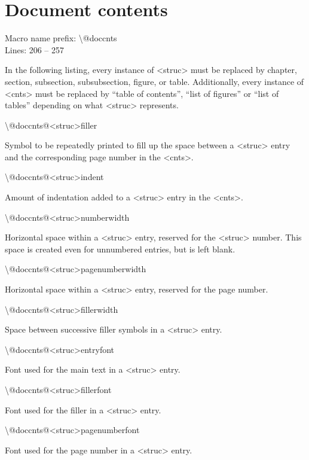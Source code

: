 \documentclass[twoside,openany]{thesis}
\begin{document}
\section{Document contents}\label{sec:Document contents}

Macro name prefix: {\ttfamily\textbackslash @doccnts}\\
Lines: 206 -- 257

In the following listing, every instance of {\ttfamily<struc>} must be replaced by {\ttfamily chapter}, {\ttfamily section}, {\ttfamily subsection}, {\ttfamily subsubsection}, {\ttfamily figure}, or {\ttfamily table}.
Additionally, every instance of {\ttfamily<cnts>} must be replaced by ``table of contents'', ``list of figures'' or ``list of tables'' depending on what {\ttfamily<struc>} represents.

\begin{listing}

\item   {\ttfamily\textbackslash @doccnts@<struc>filler}

        Symbol to be repeatedly printed to fill up the space between a {\ttfamily<struc>} entry and the corresponding page number in the {\ttfamily<cnts>}.

\item   {\ttfamily\textbackslash @doccnts@<struc>indent}

        Amount of indentation added to a {\ttfamily<struc>} entry in the {\ttfamily<cnts>}.

\item   {\ttfamily\textbackslash @doccnts@<struc>numberwidth}

        Horizontal space within a {\ttfamily<struc>} entry, reserved for the {\ttfamily<struc>} number.
        This space is created even for unnumbered entries, but is left blank.

\item   {\ttfamily\textbackslash @doccnts@<struc>pagenumberwidth}

        Horizontal space within a {\ttfamily<struc>} entry, reserved for the page number.

\item   {\ttfamily\textbackslash @doccnts@<struc>fillerwidth}

        Space between successive filler symbols in a {\ttfamily<struc>} entry.

\item   {\ttfamily\textbackslash @doccnts@<struc>entryfont}

        Font used for the main text in a {\ttfamily<struc>} entry.

\item   {\ttfamily\textbackslash @doccnts@<struc>fillerfont}

        Font used for the filler in a {\ttfamily<struc>} entry.

\item   {\ttfamily\textbackslash @doccnts@<struc>pagenumberfont}

        Font used for the page number in a {\ttfamily<struc>} entry.

\end{listing}
\end{document}
